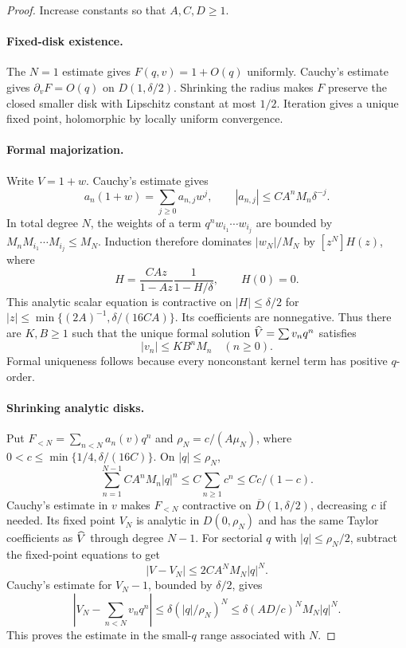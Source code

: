 \documentclass[11pt,a4paper]{article}
\numberwithin{equation}{section}
\theoremstyle{definition}\newtheorem{definition}[theorem]{Definition}
\theoremstyle{remark}\newtheorem{remark}[theorem]{Remark}
\begin{document}
\begin{proof}
Increase constants so that $A,C,D\ge1$.

\paragraph{Fixed-disk existence.}
The $N=1$ estimate gives $F(q,v)=1+O(q)$ uniformly. Cauchy's estimate
gives $\partial_vF=O(q)$ on $D(1,\delta/2)$. Shrinking the radius makes
$F$ preserve the closed smaller disk with Lipschitz constant at most
$1/2$. Iteration gives a unique fixed point, holomorphic by locally
uniform convergence.

\paragraph{Formal majorization.}
Write $V=1+w$. Cauchy's estimate gives
\[
 a_n(1+w)=\sum_{j\ge0}a_{n,j}w^j,
 \qquad |a_{n,j}|\le CA^nM_n\delta^{-j}.
\]
In total degree $N$, the weights of a term $q^nw_{i_1}\cdots w_{i_j}$
are bounded by $M_nM_{i_1}\cdots M_{i_j}\le M_N$. Induction therefore
dominates $|w_N|/M_N$ by $[z^N]H(z)$, where
\begin{equation}
 H=\frac{CAz}{1-Az}\frac1{1-H/\delta},\qquad H(0)=0.
 \label{eq:analyticmajorant}
\end{equation}
This analytic scalar equation is contractive on $|H|\le\delta/2$ for
$|z|\le\min\{(2A)^{-1},\delta/(16CA)\}$. Its coefficients are
nonnegative. Thus there are $K,B\ge1$ such that the unique formal solution
$\widehat V=\sum v_nq^n$ satisfies
\begin{equation}
 |v_n|\le KB^nM_n\quad(n\ge0).
 \label{eq:Vcoeff}
\end{equation}
Formal uniqueness follows because every nonconstant kernel term has
positive $q$-order.

\paragraph{Shrinking analytic disks.}
Put $F_{<N}=\sum_{n<N}a_n(v)q^n$ and
$\rho_N=c/(A\mu_N)$, where
$0<c\le\min\{1/4,\delta/(16C)\}$. On $|q|\le\rho_N$,
\[
 \sum_{n=1}^{N-1}CA^nM_n|q|^n\le C\sum_{n\ge1}c^n
 \le Cc/(1-c).
\]
Cauchy's estimate in $v$ makes $F_{<N}$ contractive on
$\overline D(1,\delta/2)$, decreasing $c$ if needed. Its fixed point
$V_N$ is analytic in $D(0,\rho_N)$ and has the same Taylor coefficients
as $\widehat V$ through degree $N-1$.
For sectorial $q$ with $|q|\le\rho_N/2$, subtract the fixed-point
equations to get
\begin{equation}
 |V-V_N|\le2CA^NM_N|q|^N.
 \label{eq:compareVN}
\end{equation}
Cauchy's estimate for $V_N-1$, bounded by $\delta/2$, gives
\begin{equation}
 \left|V_N-\sum_{n<N}v_nq^n\right|
 \le\delta(|q|/\rho_N)^N
 \le\delta(AD/c)^NM_N|q|^N.
 \label{eq:VNtail}
\end{equation}
This proves the estimate in the small-$q$ range associated with $N$.


\end{proof}
\end{document}

